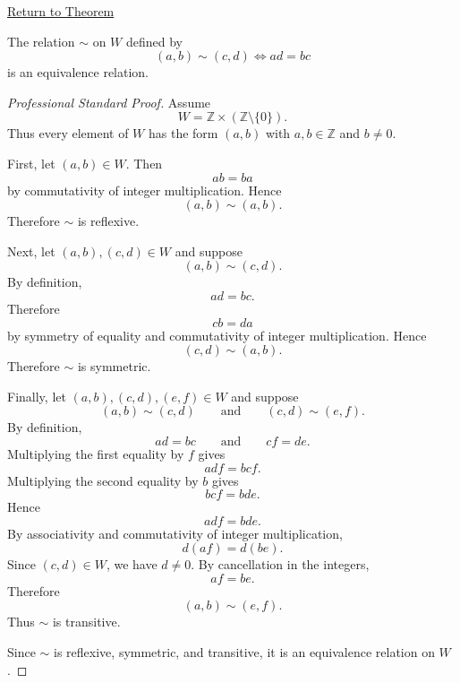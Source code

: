 \newpage
{}
\label{prf:fraction-pair-equivalence}

\begin{remark*}[Return]
\hyperref[thm:fraction-pair-equivalence]{Return to Theorem}
\end{remark*}

\begin{theorem*}
The relation $\sim$ on $W$ defined by
\[
(a,b)\sim(c,d)\iff ad=bc
\]
is an equivalence relation.
\end{theorem*}

\begin{proof}[Professional Standard Proof]
\LRAProofBodyStart
Assume
\[
W=\mathbb{Z}\times(\mathbb{Z}\setminus\{0\}).
\]
Thus every element of $W$ has the form $(a,b)$ with $a,b\in\mathbb{Z}$
and $b\neq 0$.

First, let $(a,b)\in W$. Then
\[
ab=ba
\]
by commutativity of integer multiplication. Hence
\[
(a,b)\sim(a,b).
\]
Therefore $\sim$ is reflexive.

Next, let $(a,b),(c,d)\in W$ and suppose
\[
(a,b)\sim(c,d).
\]
By definition,
\[
ad=bc.
\]
Therefore
\[
cb=da
\]
by symmetry of equality and commutativity of integer multiplication. Hence
\[
(c,d)\sim(a,b).
\]
Therefore $\sim$ is symmetric.

Finally, let $(a,b),(c,d),(e,f)\in W$ and suppose
\[
(a,b)\sim(c,d)
\qquad\text{and}\qquad
(c,d)\sim(e,f).
\]
By definition,
\[
ad=bc
\qquad\text{and}\qquad
cf=de.
\]
Multiplying the first equality by $f$ gives
\[
adf=bcf.
\]
Multiplying the second equality by $b$ gives
\[
bcf=bde.
\]
Hence
\[
adf=bde.
\]
By associativity and commutativity of integer multiplication,
\[
d(af)=d(be).
\]
Since $(c,d)\in W$, we have $d\neq 0$. By cancellation in the integers,
\[
af=be.
\]
Therefore
\[
(a,b)\sim(e,f).
\]
Thus $\sim$ is transitive.

Since $\sim$ is reflexive, symmetric, and transitive, it is an equivalence
relation on $W$.
\end{proof}

